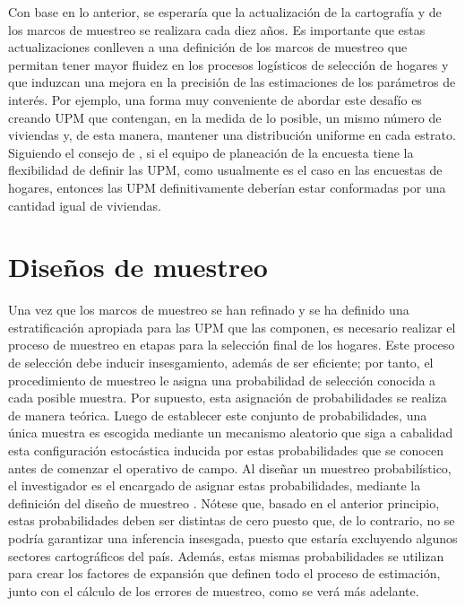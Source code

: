 \documentclass[12pt,spanish,]{book}
\begin{document}
Con base en lo anterior, se esperaría que la actualización de la cartografía y de los marcos de muestreo se realizara cada diez años. Es importante que estas actualizaciones conlleven a una definición de los marcos de muestreo que permitan tener mayor fluidez en los procesos logísticos de selección de hogares y que induzcan una mejora en la precisión de las estimaciones de los parámetros de interés. Por ejemplo, una forma muy conveniente de abordar este desafío es creando UPM que contengan, en la medida de lo posible, un mismo número de viviendas y, de esta manera, mantener una distribución uniforme en cada estrato. Siguiendo el consejo de \textcite[pág. 212]{Valliant_Dever_Kreuter_2013}, si el equipo de planeación de la encuesta tiene la flexibilidad de definir las UPM, como usualmente es el caso en las encuestas de hogares, entonces las UPM definitivamente deberían estar conformadas por una cantidad igual de viviendas.

\hypertarget{disenos-de-muestreo}{%
\section{Diseños de muestreo}\label{disenos-de-muestreo}}

Una vez que los marcos de muestreo se han refinado y se ha definido una estratificación apropiada para las UPM que las componen, es necesario realizar el proceso de muestreo en etapas para la selección final de los hogares. Este proceso de selección debe inducir insesgamiento, además de ser eficiente; por tanto, el procedimiento de muestreo le asigna una probabilidad de selección conocida a cada posible muestra. Por supuesto, esta asignación de probabilidades se realiza de manera teórica. Luego de establecer este conjunto de probabilidades, una única muestra es escogida mediante un mecanismo aleatorio que siga a cabalidad esta configuración estocástica inducida por estas probabilidades que se conocen antes de comenzar el operativo de campo. Al diseñar un muestreo probabilístico, el investigador es el encargado de asignar estas probabilidades, mediante la definición del diseño de muestreo \autocite{Sarndal_Swensson_Wretman_2003}. Nótese que, basado en el anterior principio, estas probabilidades deben ser distintas de cero puesto que, de lo contrario, no se podría garantizar una inferencia insesgada, puesto que estaría excluyendo algunos sectores cartográficos del país. Además, estas mismas probabilidades se utilizan para crear los factores de expansión que definen todo el proceso de estimación, junto con el cálculo de los errores de muestreo, como se verá más adelante.
\end{document}
